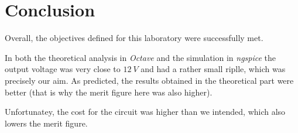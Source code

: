 
\section{Conclusion}
\label{sec:conclusion}

Overall, the objectives defined for this laboratory were successfully met.

In both the theoretical analysis in \textit{Octave} and the simulation in \textit{ngspice} the output voltage was very close to $12 \ V$ and had a rather small riplle, which was precisely our aim. As predicted, the results obtained in the theoretical part were better (that is why the merit figure here was also higher).

Unfortunatey, the cost for the circuit was higher than we intended, which also lowers the merit figure.
